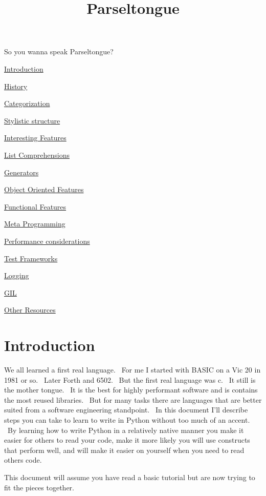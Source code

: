\documentclass[]{article}
\title{Parseltongue}
\author{}
\date{}
\begin{document}
\maketitle

So you wanna speak Parseltongue?

\hyperref[h.3ansocxiwo9]{Introduction}

\hyperref[h.jodnkjx9tm7b]{History}

\hyperref[h.kq87nccmuibo]{Categorization}

\hyperref[h.ntzqrf5bvmsx]{Stylistic structure}

\hyperref[h.jpv29t9aa3a8]{Interesting Features}

\hyperref[h.vtsupzq2n90q]{List Comprehensions}

\hyperref[h.vxmuxbhdgycd]{Generators}

\hyperref[h.nehfezpoa7wr]{Object Oriented Features}

\hyperref[h.ny9fqpb2kkvw]{Functional Features}

\hyperref[h.id8nhs8wk8ip]{Meta Programming}

\hyperref[h.55mc19riilwj]{Performance considerations}

\hyperref[h.19qm3vpgquvi]{Test Frameworks}

\hyperref[h.o5znyaqol7cr]{Logging}

\hyperref[h.honc2v4c1vj6]{GIL}

\hyperref[h.jn7qh7kh8apj]{Other Resources}

\section{Introduction}

We all learned a first real language. ~For me I started with BASIC on a
Vic 20 in 1981 or so. ~Later Forth and 6502. ~But the first real
language was c. ~It still is the mother tongue. ~It is the best for
highly performant software and is contains the most reused libraries.
~But for many tasks there are languages that are better suited from a
software engineering standpoint. ~In this document I'll describe steps
you can take to learn to write in Python without too much of an accent.
~By learning how to write Python in a relatively native manner you make
it easier for others to read your code, make it more likely you will use
constructs that perform well, and will make it easier on yourself when
you need to read others code.

This document will assume you have read a basic tutorial but are now
trying to fit the pieces together.
\end{document}
